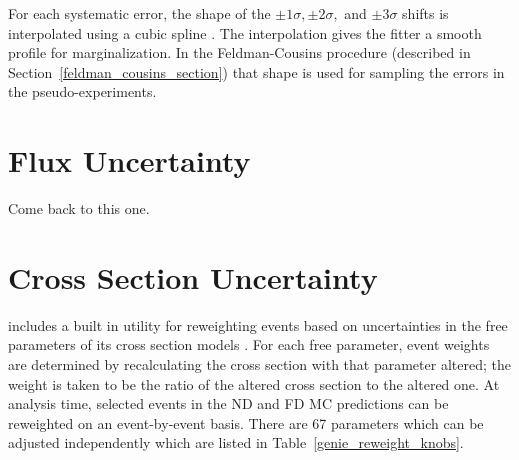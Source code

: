 For each systematic error, the shape of the
$\pm 1\sigma, \pm2\sigma,$ and
$\pm3\sigma$ shifts is interpolated using a cubic spline
\cite{atkinson1978introduction}.
The interpolation gives the fitter a smooth profile for marginalization.
In the Feldman-Cousins procedure \cite{feldman1998unified} (described
in Section~\ref{feldman_cousins_section}) that shape
is used for sampling the errors in the pseudo-experiments.

\section{Flux Uncertainty}
\label{flux_syst_section}

Come back to this one.


\section{Cross Section Uncertainty}

\genie includes a built in utility for reweighting events based on
uncertainties in the free parameters of its cross section models
\cite{genie}.
For each free parameter, event weights are determined by recalculating the
cross section with that parameter altered;
the weight is taken to be the ratio of the altered cross section
to the altered one.
At analysis time, selected events in the ND and FD MC predictions can be
reweighted on an event-by-event basis.
There are 67 parameters which can be adjusted independently which are listed
in Table~\ref{genie_reweight_knobs}.

